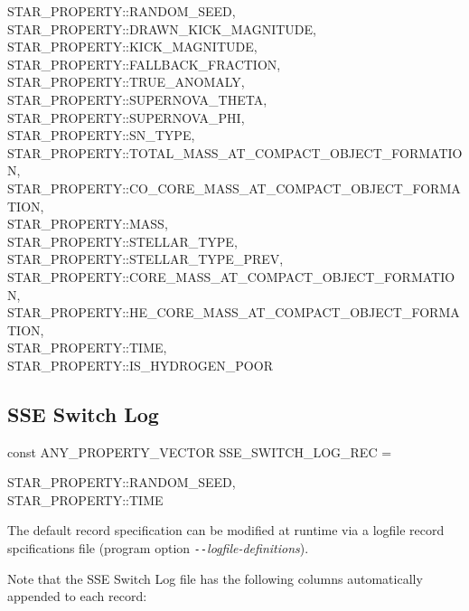 \hfill
\begin{minipage}{\dimexpr\textwidth-2em}
    STAR\_PROPERTY::RANDOM\_SEED, \\
    STAR\_PROPERTY::DRAWN\_KICK\_MAGNITUDE, \\
    STAR\_PROPERTY::KICK\_MAGNITUDE, \\
    STAR\_PROPERTY::FALLBACK\_FRACTION, \\
    STAR\_PROPERTY::TRUE\_ANOMALY, \\				
    STAR\_PROPERTY::SUPERNOVA\_THETA, \\
    STAR\_PROPERTY::SUPERNOVA\_PHI, \\
    STAR\_PROPERTY::SN\_TYPE, \\
    STAR\_PROPERTY::TOTAL\_MASS\_AT\_COMPACT\_OBJECT\_FORMATION, \\
    STAR\_PROPERTY::CO\_CORE\_MASS\_AT\_COMPACT\_OBJECT\_FORMATION, \\
    STAR\_PROPERTY::MASS, \\
    STAR\_PROPERTY::STELLAR\_TYPE, \\
    STAR\_PROPERTY::STELLAR\_TYPE\_PREV, \\
    STAR\_PROPERTY::CORE\_MASS\_AT\_COMPACT\_OBJECT\_FORMATION, \\
    STAR\_PROPERTY::HE\_CORE\_MASS\_AT\_COMPACT\_OBJECT\_FORMATION, \\
    STAR\_PROPERTY::TIME, \\
    STAR\_PROPERTY::IS\_HYDROGEN\_POOR
\end{minipage}
\par\rcb{;}

\newpage
\subsection{SSE Switch Log}\label{sec:SSESwitchLog}

const ANY\_PROPERTY\_VECTOR SSE\_SWITCH\_LOG\_REC = \lcb

\hfill
\begin{minipage}{\dimexpr\textwidth-2em}
    STAR\_PROPERTY::RANDOM\_SEED, \\
    STAR\_PROPERTY::TIME
\end{minipage}
\par\rcb{;}

\bigskip
The default record specification can be modified at runtime via a logfile record spcifications file (program option \textit{\texttt{-{}-}logfile-definitions}).

Note that the SSE Switch Log file has the following columns automatically appended to each record:


